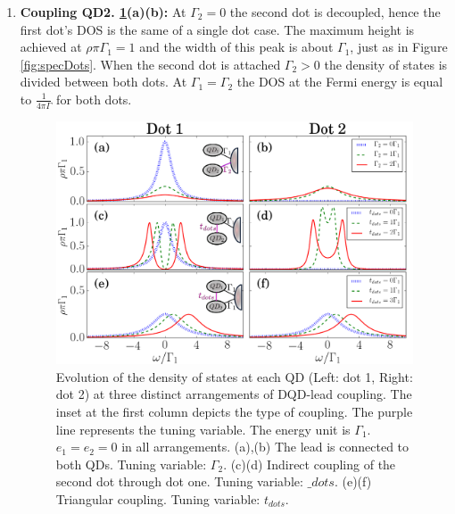 \begin{enumerate}
    \item \textbf{Coupling QD2. \ref{fig:GreenDQD}(a)(b):}  At $\Gamma_2=0$  the second dot is decoupled, hence the first dot's DOS is the same of a single dot case. The maximum height is achieved at  $\rho \pi \Gamma_1 =1$ and the width of this peak is about  $\Gamma_1$, just as in Figure \ref{fig:specDots}. When the second dot is attached $\Gamma_2 >0$ the density of states is divided between both dots. At $\Gamma_1 = \Gamma_2$ the DOS at the Fermi energy is equal to $\frac{1}{4\pi\Gamma}$ for both dots. 
    
    \begin{figure}[H]
        \centering
         \includegraphics[scale=0.47]{IMAGES/DQD/Non-interacting.png}
         \caption{\label{fig:GreenDQD} Evolution of the density of states at each QD (Left: dot 1, Right: dot 2) at three distinct arrangements of DQD-lead coupling. The inset at the first column depicts the type of coupling. The purple line represents the tuning variable. The energy unit is $\Gamma_1$. $e_1 =e_2 =0$ in all arrangements. (a),(b) The lead is connected to both QDs. Tuning variable: $\Gamma_2$. (c)(d) Indirect coupling of the second dot through dot one. Tuning variable: $\_{dots}$. (e)(f) Triangular coupling. Tuning variable: $t_{dots}$.  
         \protect{}}
    \end{figure}


\end{enumerate}

